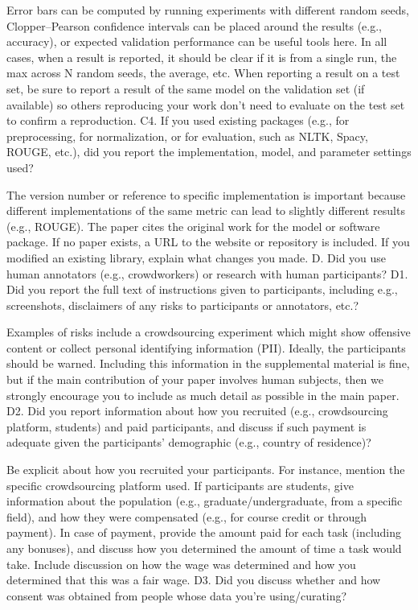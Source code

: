 Error bars can be computed by running experiments with different random seeds, Clopper–Pearson confidence intervals can be placed around the results (e.g., accuracy), or expected validation performance can be useful tools here.
In all cases, when a result is reported, it should be clear if it is from a single run, the max across N random seeds, the average, etc.
When reporting a result on a test set, be sure to report a result of the same model on the validation set (if available) so others reproducing your work don’t need to evaluate on the test set to confirm a reproduction.
C4. If you used existing packages (e.g., for preprocessing, for normalization, or for evaluation, such as NLTK, Spacy, ROUGE, etc.), did you report the implementation, model, and parameter settings used?

The version number or reference to specific implementation is important because different implementations of the same metric can lead to slightly different results (e.g., ROUGE).
The paper cites the original work for the model or software package. If no paper exists, a URL to the website or repository is included.
If you modified an existing library, explain what changes you made.
D. Did you use human annotators (e.g., crowdworkers) or research with human participants?
D1. Did you report the full text of instructions given to participants, including e.g., screenshots, disclaimers of any risks to participants or annotators, etc.?

Examples of risks include a crowdsourcing experiment which might show offensive content or collect personal identifying information (PII). Ideally, the participants should be warned.
Including this information in the supplemental material is fine, but if the main contribution of your paper involves human subjects, then we strongly encourage you to include as much detail as possible in the main paper.
D2. Did you report information about how you recruited (e.g., crowdsourcing platform, students) and paid participants, and discuss if such payment is adequate given the participants’ demographic (e.g., country of residence)?

Be explicit about how you recruited your participants. For instance, mention the specific crowdsourcing platform used. If participants are students, give information about the population (e.g., graduate/undergraduate, from a specific field), and how they were compensated (e.g., for course credit or through payment).
In case of payment, provide the amount paid for each task (including any bonuses), and discuss how you determined the amount of time a task would take. Include discussion on how the wage was determined and how you determined that this was a fair wage.
D3. Did you discuss whether and how consent was obtained from people whose data you’re using/curating?

